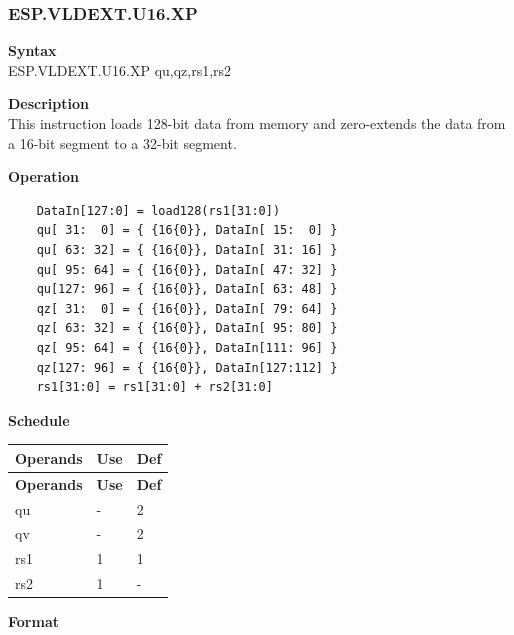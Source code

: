 \newpage
\subsubsection{ESP.VLDEXT.U16.XP}\label{instruction:ESPVLDEXTU16XP}
\textbf{Syntax}\\
ESP.VLDEXT.U16.XP qu,qz,rs1,rs2

\textbf{Description}\\
This instruction loads 128-bit data from memory and zero-extends the data from a 16-bit segment to a 32-bit segment.

\textbf{Operation}\\
\begin{lstlisting}
    DataIn[127:0] = load128(rs1[31:0])
    qu[ 31:  0] = { {16{0}}, DataIn[ 15:  0] }
    qu[ 63: 32] = { {16{0}}, DataIn[ 31: 16] }
    qu[ 95: 64] = { {16{0}}, DataIn[ 47: 32] }
    qu[127: 96] = { {16{0}}, DataIn[ 63: 48] }
    qz[ 31:  0] = { {16{0}}, DataIn[ 79: 64] }
    qz[ 63: 32] = { {16{0}}, DataIn[ 95: 80] }
    qz[ 95: 64] = { {16{0}}, DataIn[111: 96] }
    qz[127: 96] = { {16{0}}, DataIn[127:112] }
    rs1[31:0] = rs1[31:0] + rs2[31:0]
\end{lstlisting}

\textbf{Schedule}\\
\begin{longtable}[c]{|l|l|l|}
    \hline
    \rowcolor{lightgray}
    \textbf{Operands} & \textbf{Use} & \textbf{Def} \\\hline
    \endfirsthead
    \hline
    \rowcolor{lightgray}
     \textbf{Operands} & \textbf{Use} & \textbf{Def} \\\hline
    \endhead
    \hline
    \endfoot

  qu & - & 2 \\\hline
  qv & - & 2 \\\hline
  rs1 & 1 & 1 \\\hline
    rs2 & 1 & -

\end{longtable}

\textbf{Format}\\

